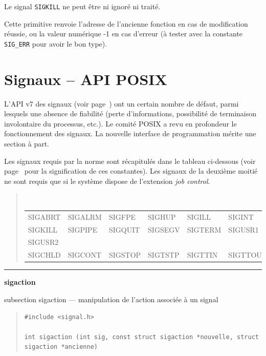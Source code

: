 \documentclass [twoside] {report}
\newcommand {\primitive} [1]
    {
	\phantomsection
	{\large \textbf {#1}}
	\addcontentsline {toc} {subsection} {#1}
    }
\newcommand {\separation}
    {
	\vspace {5mm}
	\nopagebreak
	\hrule
    }
\begin{document}
Le signal \texttt {SIGKILL} ne peut être ni ignoré ni
traité.

Cette primitive renvoie l'adresse de l'ancienne
fonction en cas de modification réussie, ou la valeur
numérique -1 en cas d'erreur (à tester avec la constante
\texttt {SIG\_ERR} pour avoir le bon type).



\section {Signaux -- API POSIX}

L'API v7 des signaux (voir page~\pageref {ps:sigv7}) ont un
certain nombre de défaut, parmi lesquels une absence de fiabilité (perte
d'informations, possibilité de terminaison involontaire du processus,
etc.).  Le comité POSIX a revu en profondeur le fonctionnement des
signaux.  La nouvelle interface de programmation mérite une section à
part.

Les signaux requis par la norme sont récapitulés dans le tableau
ci-dessous (voir page~\pageref {ps:sigv7} pour la signification de ces
constantes).  Les signaux de la deuxième moitié ne sont requis que si le
système dispose de l'extension \emph {job control}.

\begin {quote}
    \small\tt
    \begin {tabular} {|llllll|} \hline
	SIGABRT & SIGALRM & SIGFPE  & SIGHUP  & SIGILL  & SIGINT  \\
	SIGKILL & SIGPIPE & SIGQUIT & SIGSEGV & SIGTERM & SIGUSR1 \\
	SIGUSR2 &         &         &         &         &         \\ \hline
	SIGCHLD & SIGCONT & SIGSTOP & SIGTSTP & SIGTTIN & SIGTTOU \\ \hline
    \end {tabular}
\end {quote}



\separation
\primitive {sigaction} --- manipulation de l'action associée à un signal

\begin {quote}
\begin {verbatim}
#include <signal.h>

int sigaction (int sig, const struct sigaction *nouvelle, struct sigaction *ancienne)
\end{verbatim}
\end {quote}
\end{document}
